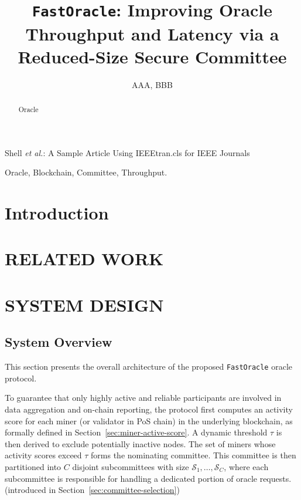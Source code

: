 \documentclass[journal]{IEEEtran}
\author{
  AAA,
  BBB
}
\newcommand{\code}[1]{\texttt{#1}}
\begin{document}
\title{\code{FastOracle}: Improving Oracle Throughput and Latency via a Reduced-Size Secure Committee}

%
{Shell \MakeLowercase{\textit{et al.}}: A Sample Article Using IEEEtran.cls for IEEE Journals}


\maketitle


\begin{abstract}

Oracle

\end{abstract}


\begin{IEEEkeywords}
Oracle, Blockchain, Committee, Throughput.
\end{IEEEkeywords}


\section{Introduction}
\label{sec:intro}


\section{RELATED WORK}

\section{SYSTEM DESIGN}
\label{sec:system_design}

\subsection{System Overview}
This section presents the overall architecture of the proposed \code{FastOracle} oracle protocol.

To guarantee that only highly active and reliable participants are involved in data aggregation and on-chain reporting, the protocol first computes an activity score for each miner (or validator in PoS chain) in the underlying blockchain, as formally defined in Section~\ref{sec:miner-active-score}. A dynamic threshold $\tau$ is then derived to exclude potentially inactive nodes. The set of miners whose activity scores exceed $\tau$ forms the nominating committee. This committee is then partitioned into $C$ disjoint subcommittees with size $\mathcal{S}_1, \dots, \mathcal{S}_{C}$, where each subcommittee is responsible for handling a dedicated portion of oracle requests. (introduced in Section~\ref{sec:committee-selection})
\end{document}
